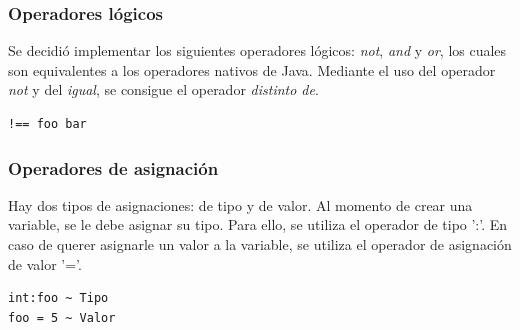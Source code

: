 \documentclass{article}
\begin{document}
            \subsubsection{Operadores lógicos}
                \par Se decidió implementar los siguientes operadores lógicos: \textit{not}, \textit{and} y \textit{or}, los cuales son equivalentes a los operadores nativos de Java. Mediante el uso del operador \textit{not} y del \textit{igual}, se consigue el operador \textit{distinto de}.
                \begin{lstlisting}
!== foo bar
                \end{lstlisting}
            \subsubsection{Operadores de asignación}
                \par Hay dos tipos de asignaciones: de tipo y de valor. Al momento de crear una variable, se le debe asignar su tipo. Para ello, se utiliza el operador de tipo ':'. En caso de querer asignarle un valor a la variable, se utiliza el operador de asignación de valor '='. 
                \begin{lstlisting}
int:foo ~ Tipo
foo = 5 ~ Valor
                \end{lstlisting}
\end{document}
